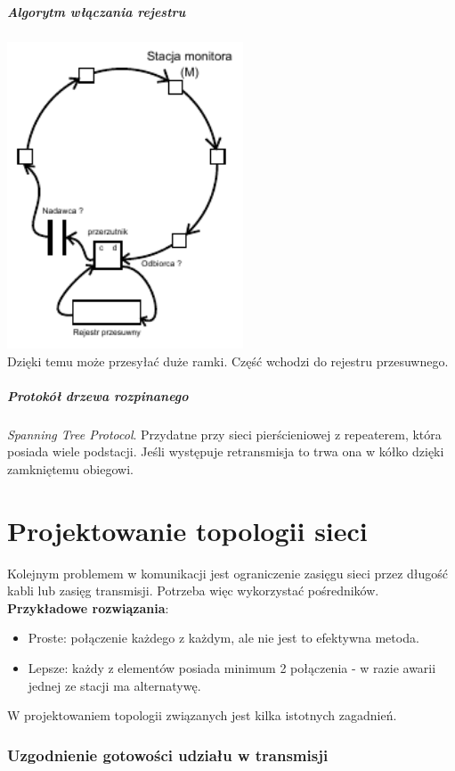 				\subsubsection{Algorytm włączania rejestru}
					\includegraphics[width=7cm]{./images/image34.pdf}\\
					Dzięki temu może przesyłać duże ramki. Część wchodzi do rejestru przesuwnego.
				\subsubsection{Protokół drzewa rozpinanego}
					\emph{Spanning Tree Protocol}. Przydatne przy sieci pierścieniowej z repeaterem, która posiada wiele podstacji. Jeśli występuje retransmisja to trwa ona w kółko dzięki zamkniętemu obiegowi.


\part{Projektowanie topologii sieci}
	Kolejnym problemem w komunikacji jest ograniczenie zasięgu sieci przez długość kabli lub zasięg transmisji. Potrzeba więc wykorzystać pośredników.\\
	\textbf{Przykładowe rozwiązania}:
	\begin{itemize}
		\item Proste: połączenie każdego z każdym, ale nie jest to efektywna metoda.
		\item Lepsze: każdy z elementów posiada minimum 2 połączenia - w razie awarii jednej ze stacji ma alternatywę.
	\end{itemize}
	W projektowaniem topologii związanych jest kilka istotnych zagadnień.
	\section{Uzgodnienie gotowości udziału w transmisji}
